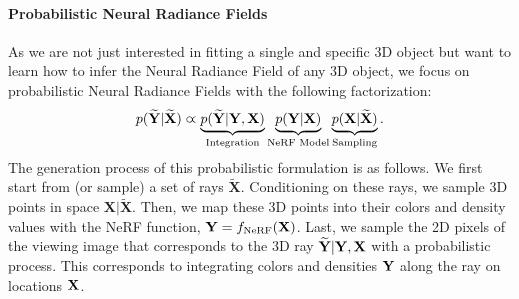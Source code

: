 \paragraph{Probabilistic Neural Radiance Fields} As we are not just interested in fitting a single and specific 3D object but want to learn how to infer the Neural Radiance Field of any 3D object,  we focus on probabilistic Neural Radiance Fields with the following factorization:
%
\begin{equation}
    p({\bf{\widetilde{Y}}} | {\bf{\widetilde{X}}}) \varpropto
    \underbrace{p({\bf{\widetilde{Y}}} | {\bf{{Y}}}, {\bf{{X}}})}_{\text{Integration}}
    \underbrace{p({\bf{{Y}}} | {\bf{{X}}})}_{\text{NeRF Model}}
    \underbrace{p({\bf{{X}}} | {\bf{\widetilde{X}}})}_{\text{Sampling}}.
\label{eq: probabilitic_NeRF}
\end{equation}
%
The generation process of this probabilistic formulation is as follows.
We first start from (or sample) a set of rays $\widetilde{\mathbf{X}}$.
Conditioning on these rays, we sample 3D points in space $\mathbf{X} \big|\widetilde{\mathbf{X}}$.
Then, we map these 3D points into their colors and density values with the NeRF function, ${\bf{Y}} = f_{\text{NeRF}}({\bf{{X}}})$.
Last, we sample the 2D pixels of the viewing image that corresponds to the 3D ray ${\widetilde{\bf{Y}}}| {\bf{{Y}}}, {\bf{X}}$ with a probabilistic process. This corresponds to integrating colors and densities ${\bf{{Y}}}$ along the ray on locations ${\bf{X}}$.

